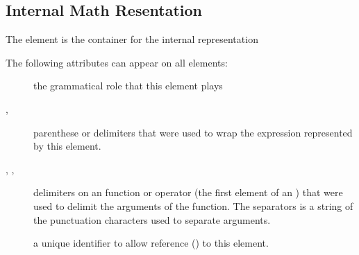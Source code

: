 \documentclass{article}
\begin{document}
\subsection{Internal Math Resentation}\label{app:mathrep}
The  element is the container for the internal representation

The following attributes can appear on all  elements:
\begin{description}
\item[] the grammatical role that this element plays 
\item[, ] parenthese or delimiters that were used to wrap the
   expression represented by this element.
\item[, , ] delimiters on an function or operator
   (the first element of an )  that were used to delimit the arguments of the function.
    The separators is a string of the punctuation characters used to separate arguments.
\item[] a unique identifier to allow reference () to this element.
\end{description}
\end{document}
